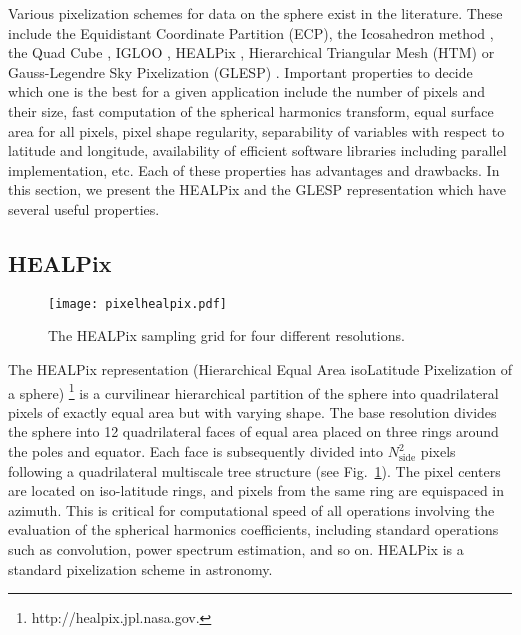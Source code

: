 Various pixelization schemes for data on the sphere exist in the literature. These include the Equidistant Coordinate Partition (ECP), 
the Icosahedron method \citep{tegmark:icos1}, the Quad Cube \citep{white92}, IGLOO \citep{igloo}, HEALPix \citep{pixel:healpix}, 
Hierarchical Triangular Mesh (HTM) \citep{kunszt01} or Gauss-Legendre Sky Pixelization (GLESP) \citep{pixel:glesp}. Important properties to decide 
which one is the best for a given application include the number of pixels and their size, fast computation of the spherical harmonics transform, 
equal surface area for all pixels, pixel shape regularity, separability of variables with respect to latitude and longitude, 
availability of efficient software libraries including parallel implementation, etc. Each of these properties has advantages and drawbacks. 
In this section, we present the HEALPix and the GLESP representation which have several useful properties. 

\subsection{HEALPix}
\label{healpix}

\begin{figure}[htb]
\centering
\texttt{[image: pixelhealpix.pdf]}
\caption{The HEALPix sampling grid for four different resolutions.}
\label{pixelhealpix}
\end{figure}

The HEALPix representation (Hierarchical Equal Area isoLatitude Pixelization of a sphere) \citep{pixel:healpix}\footnote{http://healpix.jpl.nasa.gov.} 
is a curvilinear hierarchical partition of the sphere into quadrilateral pixels of exactly equal area but with varying shape. The base resolution divides 
the sphere into 12 quadrilateral faces of equal area placed on three rings around the poles and equator. Each face is subsequently divided into 
$N_{\mathrm{side}}^{2}$ pixels following a quadrilateral multiscale  tree structure (see Fig.~\ref{pixelhealpix}). The pixel centers are located 
on iso-latitude rings, and pixels from the same ring are equispaced in azimuth. This is critical for computational speed of all operations involving 
the evaluation of the spherical harmonics coefficients, including standard operations such as convolution, power spectrum estimation, and so on.  
HEALPix is a standard pixelization scheme in astronomy. 


